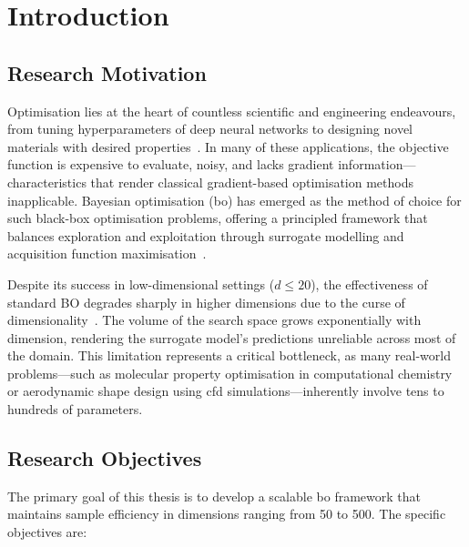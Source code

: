 \chapter{Introduction}
\label{ch:introduction}

\section{Research Motivation}
\label{sec:motivation}

Optimisation lies at the heart of countless scientific and engineering
endeavours, from tuning hyperparameters of deep neural networks to designing
novel materials with desired properties~\cite{bibid}.  In many of these
applications, the objective function is expensive to evaluate, noisy, and
lacks gradient information---characteristics that render classical gradient-based
optimisation methods inapplicable.  Bayesian optimisation
(\gls{bo}) has emerged as the method of choice for such black-box
optimisation problems, offering a principled framework that balances exploration
and exploitation through surrogate modelling and acquisition function
maximisation~\cite{einstein1905}.

Despite its success in low-dimensional settings ($d \leq 20$), the
effectiveness of standard BO degrades sharply in higher dimensions due to the
curse of dimensionality~\cite{goossensLaTeXCompanion1993}.  The volume of the
search space grows exponentially with dimension, rendering the surrogate model's
predictions unreliable across most of the domain.  This limitation represents a
critical bottleneck, as many real-world problems---such as molecular property
optimisation in computational chemistry or aerodynamic shape design using
\gls{cfd} simulations---inherently involve tens to hundreds of
parameters.

\section{Research Objectives}
\label{sec:objectives}

The primary goal of this thesis is to develop a scalable \gls{bo} framework
that maintains sample efficiency in dimensions ranging from 50 to 500.  The
specific objectives are:

